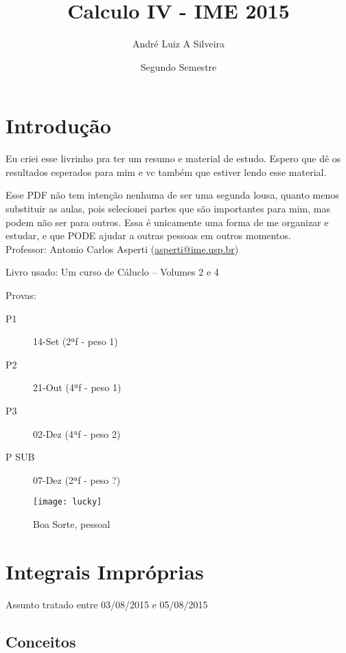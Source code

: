 \documentclass[12pt,openany]{book}
\title{Calculo IV - IME 2015}
\author{André Luiz A Silveira}
\date{Segundo Semestre}
\begin{document}
\maketitle

\tableofcontents

\chapter{Introdução}
\label{chap:c1}

\hspace{5mm} Eu criei esse livrinho pra ter um resumo e material de estudo. Espero que dê os resultados esperados para mim e vc também que estiver lendo esse material. 

Esse PDF não tem intenção nenhuma de ser uma segunda lousa, quanto menos substituir as aulas, pois selecionei partes que são importantes para mim, mas podem não ser para outros. Essa é unicamente uma forma de me organizar e estudar, e que PODE ajudar a outras pessoas em outros momentos.\\

Professor: 	Antonio Carlos Asperti (\href{mailto:asperti@ime.usp.br}{asperti@ime.usp.br})

Livro usado: Um curso de Cáluclo -- Volumes 2 e 4

Provas:
\begin{description}
\item[P1] 14-Set (2ªf - peso 1)
\item[P2] 21-Out (4ªf - peso 1)
\item[P3] 02-Dez (4ªf - peso 2)
\item[P SUB] 07-Dez (2ªf - peso ?)
\end{description}

\begin{figure}
\centering
\texttt{[image: lucky]}
\caption{Boa Sorte, pessoal}
\label{fig:lucky}
\end{figure}



\chapter{Integrais Impróprias}
\label{chap:c2}

\hspace{5mm} Assunto tratado entre 03/08/2015 e 05/08/2015
\section{Conceitos}
\label{sec:s21}
\end{document}
